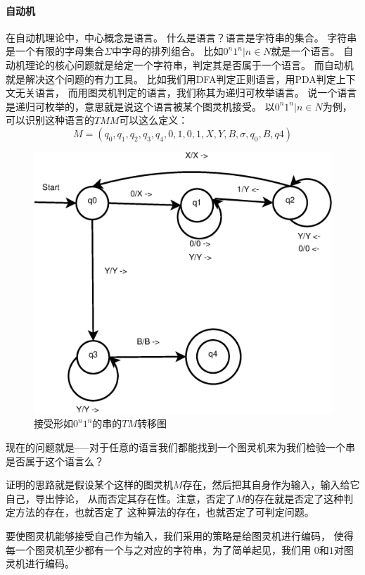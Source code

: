 \documentclass[12pt,a4paper,oneside]{ctexrep}
\theoremstyle{definition}
\begin{document}
\paragraph{自动机}
在自动机理论中，中心概念是语言。
什么是语言？语言是字符串的集合。
字符串是一个有限的字母集合$\Sigma$中字母的排列组合。
比如${0^n1^n|n \in N}$就是一个语言。
自动机理论的核心问题就是给定一个字符串，判定其是否属于一个语言。
而自动机就是解决这个问题的有力工具。
比如我们用DFA判定正则语言，用PDA判定上下文无关语言，
而用图灵机判定的语言，我们称其为递归可枚举语言。
说一个语言是递归可枚举的，意思就是说这个语言被某个图灵机接受。
以${0^n1^n|n \in N}$为例，可以识别这种语言的$TM M$可以这么定义：
\begin{equation}
M=({q_0,q_1,q_2,q_3,q_4},{0,1},{0,1,X,Y,B},\sigma,q_0,B,{q4})
\end{equation}

\begin{figure}
\centering
\includegraphics[scale=0.7]{tm}
\caption{接受形如$0^n1^n$的串的$TM$转移图}
\end{figure}

现在的问题就是-----对于任意的语言我们都能找到一个图灵机来为我们检验一个串是否属于这个语言么？

证明的思路就是假设某个这样的图灵机$M$存在，然后把其自身作为输入，输入给它自己，导出悖论，
从而否定其存在性。注意，否定了$M$的存在就是否定了这种判定方法的存在，也就否定了
这种算法的存在，也就否定了可判定问题。

要使图灵机能够接受自己作为输入，我们采用的策略是给图灵机进行编码，
使得每一个图灵机至少都有一个与之对应的字符串，为了简单起见，我们用
$0$和$1$对图灵机进行编码。
\end{document}
